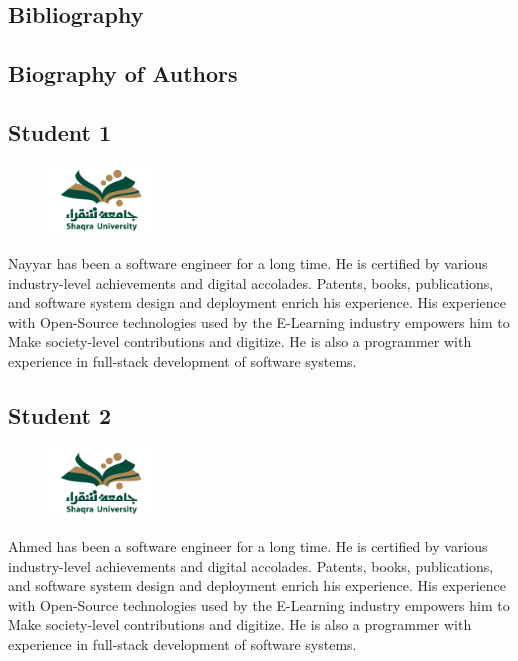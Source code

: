 \documentclass[a4paper,12pt]{report}
\newenvironment{pageborder}{
  \begin{tcolorbox}[width=\textwidth, height=\textheight, colframe=black, colback=white, sharp corners, boxrule=0.5mm, nobeforeafter]
}{
  \end{tcolorbox}
}
\begin{document}
\newpage
\begin{pageborder}
  \chapter{Bibliography}
  \printbibliography
\end{pageborder}

\newpage

\begin{pageborder}
  \chapter{Biography of Authors}
  \section*{Student 1}
  \begin{figure}
    \vspace{-10pt}
    \includegraphics[width=0.25\textwidth]{LOGO.jpg}  %
    \vspace{-20pt}
  \end{figure}
  Nayyar has been a software engineer for a long time. He is certified by various industry-level achievements and digital accolades. Patents, books, publications, and software system design and deployment enrich his experience. His experience with Open-Source technologies used by the E-Learning industry empowers him to Make society-level contributions and digitize. He is also a programmer with experience in full-stack development of software systems.

  \section*{Student 2}
  \begin{figure}
    \vspace{-10pt}
    \includegraphics[width=0.25\textwidth]{LOGO.jpg}  %
    \vspace{-20pt}
  \end{figure}
  Ahmed has been a software engineer for a long time. He is certified by various industry-level achievements and digital accolades. Patents, books, publications, and software system design and deployment enrich his experience. His experience with Open-Source technologies used by the E-Learning industry empowers him to Make society-level contributions and digitize. He is also a programmer with experience in full-stack development of software systems.


\end{pageborder}
\end{document}
